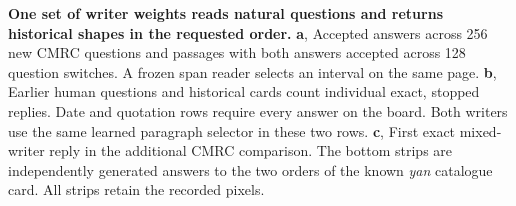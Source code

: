 \textbf{One set of writer weights reads natural questions and returns historical shapes in the requested order.}
\textbf{a}, Accepted answers across 256 new CMRC questions and passages with both answers accepted across 128 question switches. A frozen span reader selects an interval on the same page.
\textbf{b}, Earlier human questions and historical cards count individual exact, stopped replies. Date and quotation rows require every answer on the board. Both writers use the same learned paragraph selector in these two rows.
\textbf{c}, First exact mixed-writer reply in the additional CMRC comparison. The bottom strips are independently generated answers to the two orders of the known \textit{yan} catalogue card. All strips retain the recorded pixels.
